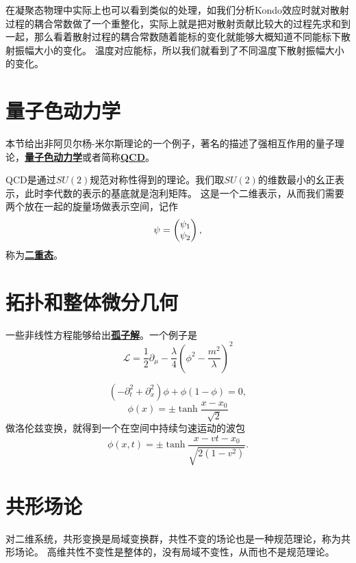 \documentclass[hyperref, UTF8, a4paper]{ctexart}
\newcommand{\concept}[1]{\underline{\textbf{#1}}}
\begin{document}
在凝聚态物理中实际上也可以看到类似的处理，如我们分析Kondo效应时就对散射过程的耦合常数做了一个重整化，实际上就是把对散射贡献比较大的过程先求和到一起，那么看着散射过程的耦合常数随着能标的变化就能够大概知道不同能标下散射振幅大小的变化。
温度对应能标，所以我们就看到了不同温度下散射振幅大小的变化。

\section{量子色动力学}

本节给出非阿贝尔杨-米尔斯理论的一个例子，著名的描述了强相互作用的量子理论，\concept{量子色动力学}或者简称\concept{QCD}。

QCD是通过$SU(2)$规范对称性得到的理论。我们取$SU(2)$的维数最小的幺正表示，此时李代数的表示的基底就是泡利矩阵。
这是一个二维表示，从而我们需要两个放在一起的旋量场做表示空间，记作
\begin{equation}
    \psi = \pmqty{\psi_1 \\ \psi_2},
\end{equation}
称为\concept{二重态}。

\section{拓扑和整体微分几何}

一些非线性方程能够给出\concept{孤子解}。一个例子是
\begin{equation}
    \mathcal{L} = \frac{1}{2} \partial_\mu - \frac{\lambda}{4} \left(\phi^2 - \frac{m^2}{\lambda} \right)^2
\end{equation}

\begin{equation}
    (-\partial_t^2 + \partial_x^2) \phi + \phi ( 1- \phi) = 0,
\end{equation}
\begin{equation}
    \phi(x) = \pm \tanh \frac{x - x_0}{\sqrt{2}}
\end{equation}
做洛伦兹变换，就得到一个在空间中持续匀速运动的波包
\begin{equation}
    \phi(x, t) = \pm \tanh \frac{x - vt - x_0}{\sqrt{2(1-v^2)}}.
\end{equation}



\section{共形场论}

对二维系统，共形变换是局域变换群，共性不变的场论也是一种规范理论，称为共形场论。
高维共性不变性是整体的，没有局域不变性，从而也不是规范理论。
\end{document}
